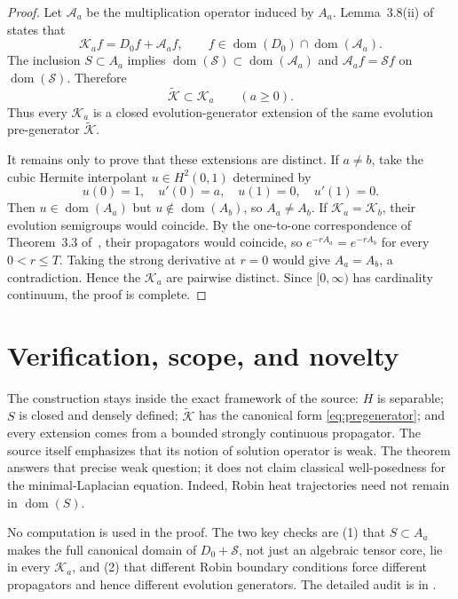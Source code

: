 \documentclass[11pt]{article}
\newcommand{\dom}{\operatorname{dom}}
\newcommand{\Ktilde}{\widetilde{\mathcal K}}
\begin{document}
\begin{proof}
Let $\mathcal A_a$ be the multiplication operator induced by $A_a$.
Lemma~3.8(ii) of~\cite{NSZ} states that
\[
 \mathcal K_a f=D_0f+\mathcal A_a f,
 \qquad f\in\dom(D_0)\cap\dom(\mathcal A_a).
\]
The inclusion $S\subset A_a$ implies
$\dom(\mathcal S)\subset\dom(\mathcal A_a)$ and
$\mathcal A_a f=\mathcal S f$ on $\dom(\mathcal S)$.  Therefore
\[
 \Ktilde\subset\mathcal K_a
 \qquad(a\geq0).
\]
Thus every $\mathcal K_a$ is a closed evolution-generator extension of the
same evolution pre-generator $\Ktilde$.

It remains only to prove that these extensions are distinct.  If
$a\ne b$, take the cubic Hermite interpolant $u\in H^2(0,1)$ determined by
\[
 u(0)=1,\quad u'(0)=a,\quad u(1)=0,\quad u'(1)=0.
\]
Then $u\in\dom(A_a)$ but $u\notin\dom(A_b)$, so $A_a\ne A_b$.  If
$\mathcal K_a=\mathcal K_b$, their evolution semigroups would coincide.
By the one-to-one correspondence of Theorem~3.3 of~\cite{NSZ}, their
propagators would coincide, so
$e^{-rA_a}=e^{-rA_b}$ for every $0<r\leq T$.  Taking the strong derivative at
$r=0$ would give $A_a=A_b$, a contradiction.  Hence the $\mathcal K_a$ are
pairwise distinct.  Since $[0,\infty)$ has cardinality continuum, the proof is
complete.
\end{proof}

\section{Verification, scope, and novelty}

The construction stays inside the exact framework of the source: $H$ is
separable; $S$ is closed and densely defined; $\Ktilde$ has the canonical form
\eqref{eq:pregenerator}; and every extension comes from a bounded strongly
continuous propagator.  The source itself emphasizes that its notion of
solution operator is weak.  The theorem answers that precise weak question;
it does not claim classical well-posedness for the minimal-Laplacian equation.
Indeed, Robin heat trajectories need not remain in $\dom(S)$.

No computation is used in the proof.  The two key checks are (1) that
$S\subset A_a$ makes the full canonical domain of $D_0+\mathcal S$, not just
an algebraic tensor core, lie in every $\mathcal K_a$, and (2) that different
Robin boundary conditions force different propagators and hence different
evolution generators.  The detailed audit is in .
\end{document}
